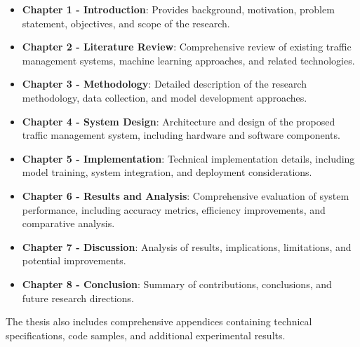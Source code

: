\begin{itemize}
    \item \textbf{Chapter 1 - Introduction}: Provides background, motivation, problem statement, objectives, and scope of the research.
    
    \item \textbf{Chapter 2 - Literature Review}: Comprehensive review of existing traffic management systems, machine learning approaches, and related technologies.
    
    \item \textbf{Chapter 3 - Methodology}: Detailed description of the research methodology, data collection, and model development approaches.
    
    \item \textbf{Chapter 4 - System Design}: Architecture and design of the proposed traffic management system, including hardware and software components.
    
    \item \textbf{Chapter 5 - Implementation}: Technical implementation details, including model training, system integration, and deployment considerations.
    
    \item \textbf{Chapter 6 - Results and Analysis}: Comprehensive evaluation of system performance, including accuracy metrics, efficiency improvements, and comparative analysis.
    
    \item \textbf{Chapter 7 - Discussion}: Analysis of results, implications, limitations, and potential improvements.
    
    \item \textbf{Chapter 8 - Conclusion}: Summary of contributions, conclusions, and future research directions.
\end{itemize}

The thesis also includes comprehensive appendices containing technical specifications, code samples, and additional experimental results. 